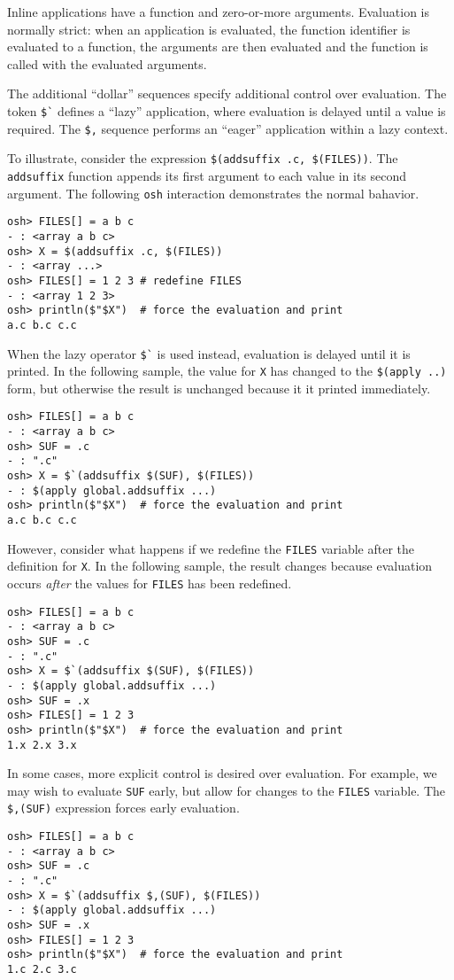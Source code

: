 Inline applications have a function and zero-or-more arguments.  Evaluation is normally strict: when
an application is evaluated, the function identifier is evaluated to a function, the arguments are
then evaluated and the function is called with the evaluated arguments.

The additional ``dollar'' sequences specify additional control over evaluation.  The token \verb+$`+
defines a ``lazy'' application, where evaluation is delayed until a value is required.  The
\verb+$,+ sequence performs an ``eager'' application within a lazy context.

To illustrate, consider the expression \verb+$(addsuffix .c, $(FILES))+.  The \verb+addsuffix+
function appends its first argument to each value in its second argument.  The following \verb+osh+
interaction demonstrates the normal bahavior.

\begin{verbatim}
osh> FILES[] = a b c
- : <array a b c>
osh> X = $(addsuffix .c, $(FILES))
- : <array ...>
osh> FILES[] = 1 2 3 # redefine FILES
- : <array 1 2 3>
osh> println($"$X")  # force the evaluation and print
a.c b.c c.c
\end{verbatim}

When the lazy operator \verb+$`+ is used instead, evaluation is delayed until it is printed.  In the
following sample, the value for \verb+X+ has changed to the \verb+$(apply ..)+ form, but otherwise
the result is unchanged because it it printed immediately.

\begin{verbatim}
osh> FILES[] = a b c
- : <array a b c>
osh> SUF = .c
- : ".c"
osh> X = $`(addsuffix $(SUF), $(FILES))
- : $(apply global.addsuffix ...)
osh> println($"$X")  # force the evaluation and print
a.c b.c c.c
\end{verbatim}

However, consider what happens if we redefine the \verb+FILES+ variable after the definition for
\verb+X+.  In the following sample, the result changes because evaluation occurs \emph{after} the
values for \verb+FILES+ has been redefined.

\begin{verbatim}
osh> FILES[] = a b c
- : <array a b c>
osh> SUF = .c
- : ".c"
osh> X = $`(addsuffix $(SUF), $(FILES))
- : $(apply global.addsuffix ...)
osh> SUF = .x
osh> FILES[] = 1 2 3
osh> println($"$X")  # force the evaluation and print
1.x 2.x 3.x
\end{verbatim}

In some cases, more explicit control is desired over evaluation.  For example, we may wish to
evaluate \verb+SUF+ early, but allow for changes to the \verb+FILES+ variable.  The \verb+$,(SUF)+
expression forces early evaluation.

\begin{verbatim}
osh> FILES[] = a b c
- : <array a b c>
osh> SUF = .c
- : ".c"
osh> X = $`(addsuffix $,(SUF), $(FILES))
- : $(apply global.addsuffix ...)
osh> SUF = .x
osh> FILES[] = 1 2 3
osh> println($"$X")  # force the evaluation and print
1.c 2.c 3.c
\end{verbatim}

